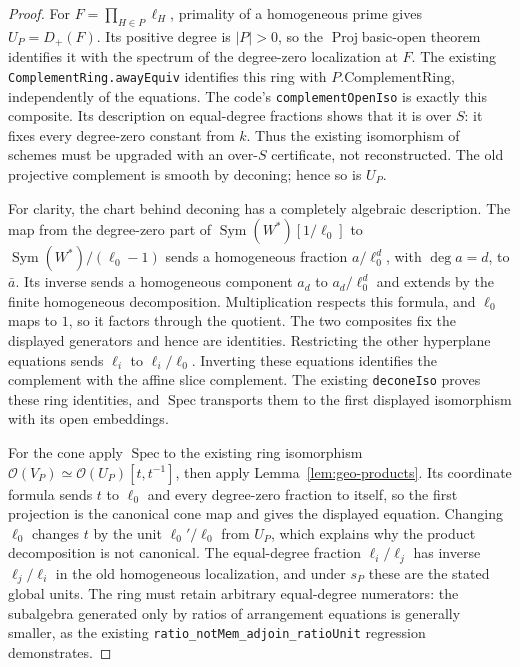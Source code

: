 \documentclass[11pt]{article}
\newcommand{\Spec}{\operatorname{Spec}}
\newcommand{\planned}[1]{\texttt{\detokenize{#1}}}
\theoremstyle{definition}
\theoremstyle{remark}
\newcommand{\OO}{\mathcal O}
\renewcommand{\Spec}{\ensuremath{\operatorname{Spec}}}
\newcommand{\Proj}{\ensuremath{\operatorname{Proj}}}
\renewcommand{\planned}[1]{\nolinkurl{#1}}
\begin{document}
\begin{proof}
For $F=\prod_{H\in P}\ell_H$, primality of a homogeneous prime gives
$U_P=D_+(F)$. Its positive degree is $|P|>0$, so the \Proj basic-open theorem identifies it with the spectrum of the degree-zero localization at $F$. The existing \planned{ComplementRing.awayEquiv} identifies this ring with $P.\mathrm{ComplementRing}$, independently of the equations. The code's \planned{complementOpenIso} is exactly this composite. Its description on equal-degree fractions shows that it is over $S$: it fixes every degree-zero constant from $k$. Thus the existing isomorphism of schemes must be upgraded with an over-$S$ certificate, not reconstructed. The old projective complement is smooth by deconing; hence so is $U_P$.

For clarity, the chart behind deconing has a completely algebraic description. The map from the degree-zero part of $\operatorname{Sym}(W^*)[1/\ell_0]$ to
$\operatorname{Sym}(W^*)/(\ell_0-1)$ sends a homogeneous fraction $a/\ell_0^d$, with $\deg a=d$, to $\bar a$. Its inverse sends a homogeneous component $a_d$ to $a_d/\ell_0^d$ and extends by the finite homogeneous decomposition. Multiplication respects this formula, and $\ell_0$ maps to $1$, so it factors through the quotient. The two composites fix the displayed generators and hence are identities. Restricting the other hyperplane equations sends $\ell_i$ to $\ell_i/\ell_0$. Inverting these equations identifies the complement with the affine slice complement. The existing \planned{deconeIso} proves these ring identities, and \Spec transports them to the first displayed isomorphism with its open embeddings.

For the cone apply \Spec to the existing ring isomorphism
$\OO(V_P)\simeq\OO(U_P)[t,t^{-1}]$, then apply Lemma~\ref{lem:geo-products}. Its coordinate formula sends $t$ to $\ell_0$ and every degree-zero fraction to itself, so the first projection is the canonical cone map and gives the displayed equation. Changing $\ell_0$ changes $t$ by the unit $\ell_0'/\ell_0$ from $U_P$, which explains why the product decomposition is not canonical. The equal-degree fraction $\ell_i/\ell_j$ has inverse $\ell_j/\ell_i$ in the old homogeneous localization, and under $s_P$ these are the stated global units. The ring must retain arbitrary equal-degree numerators: the subalgebra generated only by ratios of arrangement equations is generally smaller, as the existing \planned{ratio_notMem_adjoin_ratioUnit} regression demonstrates.
\end{proof}
\end{document}
